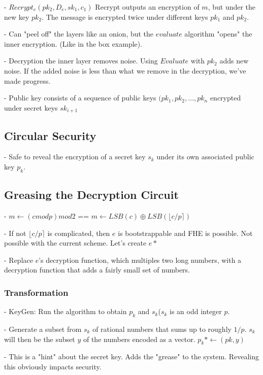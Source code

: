 \documentclass[10pt]{article}
\begin{document}
- $Recrypt_e(pk_2,D_e, sk_1, c_1)$ Recrypt outputs an encryption of $m$, but under the new key $pk_2$. The message is encrypted twice under different keys $pk_1$ and $pk_2$.

- Can "peel off" the layers like an onion, but the $evaluate$ algorithm "opens" the inner encryption. (Like in the box example).

- Decryption the inner layer removes noise. Using $Evaluate$ with $pk_2$ adds new noise. If the added noise is less than what we remove in the decryption, we've made progress.

- Public key consists of a sequence of public keys $(pk_1, pk_2, ..., pk_n$ encrypted under secret keys $sk_{i+1}$

\subsection{Circular Security}

- Safe to reveal the encryption of a secret key $s_k$ under its own associated public key $p_k$.

\subsection{Greasing the Decryption Circuit}

- $m \leftarrow (c mod p) mod 2$ == $m \leftarrow LSB(c) \oplus LSB(\lfloor c/p\rceil)$

- If not $\lfloor c/p\rceil$ is complicated, then $e$ is bootstrappable and FHE is possible. Not possible with the current scheme. Let's create $e*$

- Replace $e$'s decryption function, which multiples two long numbers, with a decryption function that adds a fairly small set of numbers.

\subsubsection{Transformation}

- KeyGen: Run the algorithm to obtain $p_k$ and $s_k$($s_k$ is an odd integer $p$.

- Generate a subset from $s_k$ of rational numbers that sums up to roughly $1/p$. $s_k$ will then be the subset $y$ of the numbers encoded as a vector. $p_k* \leftarrow (pk, y)$

- This is a "hint" about the secret key. Adds the "grease" to the system. Revealing this obviously impacts security.
\end{document}
